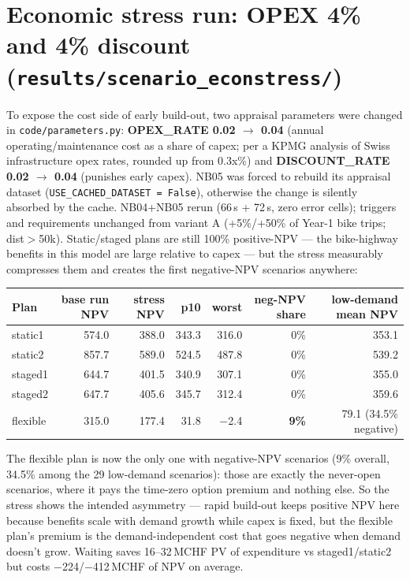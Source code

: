 \documentclass[10pt,a4paper]{article}
\begin{document}
\section{Economic stress run: OPEX 4\% and 4\% discount (\texttt{results/scenario\_econstress/})}
To expose the cost side of early build-out, two appraisal parameters were changed in
\texttt{code/parameters.py}: \textbf{OPEX\_RATE 0.02 $\to$ 0.04} (annual operating/maintenance
cost as a share of capex; per a KPMG analysis of Swiss infrastructure opex rates, rounded up
from 0.3x\%) and \textbf{DISCOUNT\_RATE 0.02 $\to$ 0.04} (punishes early capex). NB05 was forced
to rebuild its appraisal dataset (\texttt{USE\_CACHED\_DATASET = False}), otherwise the change
is silently absorbed by the cache. NB04+NB05 rerun (66\,s + 72\,s, zero error cells); triggers
and requirements unchanged from variant A (+5\%/+50\% of Year-1 bike trips; dist${>}$50k).
Static/staged plans are still 100\% positive-NPV --- the bike-highway benefits in this model
are large relative to capex --- but the stress measurably compresses them and creates the
first negative-NPV scenarios anywhere:

\begin{tabular}{@{}lrrrrrr@{}}
\toprule
Plan & base run NPV & stress NPV & p10 & worst & neg-NPV share & low-demand mean NPV \\
\midrule
static1 & 574.0 & 388.0 & 343.3 & 316.0 & 0\% & 353.1 \\
static2 & 857.7 & 589.0 & 524.5 & 487.8 & 0\% & 539.2 \\
staged1 & 644.7 & 401.5 & 340.9 & 307.1 & 0\% & 355.0 \\
staged2 & 647.7 & 405.6 & 345.7 & 312.4 & 0\% & 359.6 \\
flexible & 315.0 & 177.4 & 31.8 & $-$2.4 & \textbf{9\%} & 79.1 (34.5\% negative) \\
\bottomrule
\end{tabular}

The flexible plan is now the only one with negative-NPV scenarios (9\% overall, 34.5\% among the
29 low-demand scenarios): those are exactly the never-open scenarios, where it pays the
time-zero option premium and nothing else. So the stress shows the intended asymmetry ---
rapid build-out keeps positive NPV here because benefits scale with demand growth while capex
is fixed, but the flexible plan's premium is the demand-independent cost that goes negative
when demand doesn't grow. Waiting saves 16--32\,MCHF PV of expenditure vs staged1/static2
but costs $-$224/$-$412\,MCHF of NPV on average.
\end{document}
